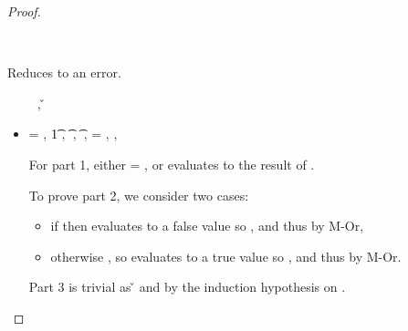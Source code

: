 \begin{lemma}
\begin{proof}
\begin{case}[BE-Assoc3]
  \ 

  Reduces to an error.
\end{case}

\begin{case}[B-IfFalse]
        \opsem {\openv{}} {} {\false}
        \ \ \ \ 
        \opsem {\openv{}} {} {\nil},
        \opsem {\openv{}} {} {\v{}}

  \begin{itemize}
    \item[]
      \begin{subcase}[T-If]
  \ep{} = { {} {}},
  \judgementrewrite {\propenv{}} {\ep1} {\t{1}} { {}}
                 {\object{1}}
                 {},
                 {} {\t{}} { {}}
                 {\object{}}
                 {},
                 {} {\t{}} { {}}
                 {\object{}}
                 {},
  \e{} = { {} {}},
  ,
  \inpropenv{\orprop {\elseprop {\prop{2}}} {\elseprop {\prop{3}}}}{\elseprop{\prop{}}}

              For part 1, either \object{} = \emptyobject{}, or \e{} evaluates to the
              result of \e{3}.

              To prove part 2, we consider two cases:
              \begin{itemize}
                \item if \isfalseval{\v{}}
                  then  evaluates to a false value so {}, and thus
                  {\satisfies{\openv{}}{\orprop {\elseprop {\prop{2}}} {\elseprop {\prop{3}}}}} by M-Or, 
                \item otherwise
                  \istrueval{\v{}},
                  so  evaluates to a true value so {}, and thus
                  {\satisfies{\openv{}}{\orprop {\thenprop {\prop{2}}} {\thenprop {\prop{3}}}}} by M-Or.
              \end{itemize}

              Part 3 is trivial as
              \opsem {\openv{}} {} {\v{}}
              and {\judgementtwo{}{\v{}}{\t{}}} by the induction hypothesis on {}.
      \end{subcase}
  \end{itemize}
\end{case}


\end{proof}
\end{lemma}
